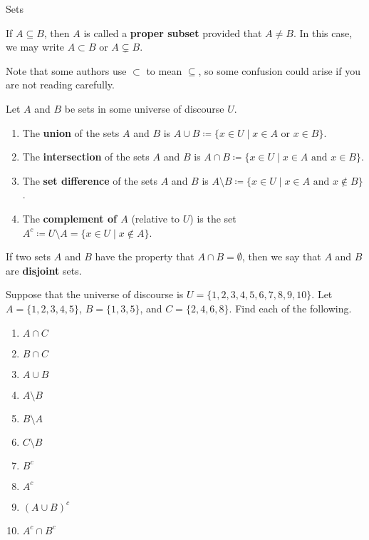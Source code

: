 \begin{section}{Sets}
\begin{definition}
If $A\subseteq B$, then $A$ is called a \textbf{proper subset} provided that $A\neq B$.  In this case, we may write $\boxed{A\subset B}$ or $\boxed{A\subsetneq B}$.
\end{definition}

Note that some authors use $\subset$ to mean $\subseteq$, so some confusion could arise if you are not reading carefully.

\begin{definition}
Let $A$ and $B$ be sets in some universe of discourse $U$.
\begin{enumerate}[label=\textrm{(\alph*)}]
\item The \textbf{union} of the sets $A$ and $B$ is $\boxed{A \cup B \coloneqq \{x\in U \mid x\in A \mbox{ or } x\in B \}}$.
\item The \textbf{intersection} of the sets $A$ and $B$ is $\boxed{A \cap B \coloneqq\{x\in U \mid x\in A \mbox{ and } x\in B \}}$.
\item The \textbf{set difference} of the sets $A$ and $B$ is $\boxed{A \setminus B \coloneqq\{x\in U \mid x\in A \mbox{ and } x\notin B \}}$.
\item The \textbf{complement of $A$} (relative to $U$) is the set $\boxed{A^c\coloneqq U \setminus A =\{x \in U \mid x \notin A\}}$.
\end{enumerate}
\end{definition}

\begin{definition}
If two sets $A$ and $B$ have the property that $A \cap B = \emptyset$, then we say that $A$ and $B$ are \textbf{disjoint} sets.
\end{definition}

\begin{problem}
Suppose that the universe of discourse is $U=\{1,2,3,4,5,6,7,8,9,10\}$.  Let $A=\{1, 2, 3, 4, 5\}$, $B=\{1, 3, 5\}$, and $C=\{2, 4, 6, 8\}$.  Find each of the following.
\begin{multicols}{2}
\begin{enumerate}[label=\textrm{(\alph*)}]
\item $A \cap C$
\item $B \cap C$
\item $A \cup B$
\item $A\setminus B$
\item $B \setminus A$
\item $C \setminus B$
\item $B^c$
\item $A^c$
\item $(A\cup B)^c$
\item $A^c\cap B^c$
\end{enumerate}
\end{multicols}
\end{problem}


\end{section}
